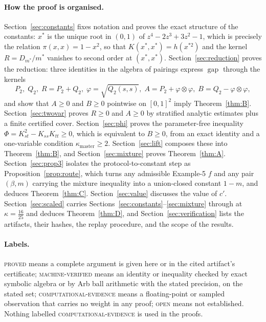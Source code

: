 \documentclass[11pt]{article}
\theoremstyle{plain}
\theoremstyle{definition}
\theoremstyle{remark}
\newcommand{\gap}{\operatorname{gap}}
\newcommand{\lbl}[1]{\textsc{#1}}
\begin{document}
\paragraph{How the proof is organised.}
Section~\ref{sec:constants} fixes notation and proves the exact structure of
the constants: $x^\ast$ is the unique root in $(0,1)$ of
$z^4-2z^3+3z^2-1$, which is precisely the relation $\pi(x,x)=1-x^2$, so
that $K(x^\ast,x^\ast)=h(x^{\ast2})$ and the kernel
$R=D_{m^\ast}/m^\ast$ vanishes to second order at $(x^\ast,x^\ast)$.
Section~\ref{sec:reduction} proves the reduction: three identities in the
algebra of pairings express $\gap$ through the kernels
\[
  P_2,\;Q_2,\;R=P_2+Q_2,\;\varphi=\sqrt{Q_2(s,s)},\;
  A=P_2+\varphi\otimes\varphi,\; B=Q_2-\varphi\otimes\varphi,
\]
and show that $A\ge0$ and $B\ge0$ pointwise on $[0,1]^2$ imply
Theorem~\ref{thm:B}.  Section~\ref{sec:twovar} proves $R\ge0$ and $A\ge0$ by
stratified analytic estimates plus a finite certified cover.
Section~\ref{sec:phi} proves the parameter-free inequality
$\Phi=K_{st}^2-K_{ss}K_{tt}\ge0$, which is equivalent to $B\ge0$, from an
exact identity and a one-variable condition $\kappa_{\mathrm{master}}\ge2$.
Section~\ref{sec:lift} composes these into Theorem~\ref{thm:B}, and
Section~\ref{sec:mixture} proves Theorem~\ref{thm:A}.
Section~\ref{sec:prop3} isolates the protocol-to-constant step as
Proposition~\ref{prop:route}, which turns any admissible Example-5 $f$ and
any pair $(\beta,m)$ carrying the mixture inequality into a union-closed
constant $1-m$, and deduces Theorem~\ref{thm:C}.
Section~\ref{sec:value} discusses the value of $c'$.
Section~\ref{sec:scaled} carries Sections~\ref{sec:constants}--\ref{sec:mixture}
through at $\kappa=\tfrac{16}{25}$ and deduces Theorem~\ref{thm:D}, and
Section~\ref{sec:verification} lists the
artifacts, their hashes, the replay procedure, and the scope of the results.

\paragraph{Labels.}
\lbl{proved} means a complete argument is given here or in the cited
artifact's certificate; \lbl{machine-verified} means an identity or
inequality checked by exact symbolic algebra or by Arb ball arithmetic with
the stated precision, on the stated set; \lbl{computational-evidence} means
a floating-point or sampled observation that carries no weight in any proof;
\lbl{open} means not established.  Nothing labelled
\lbl{computational-evidence} is used in the proofs.
\end{document}
